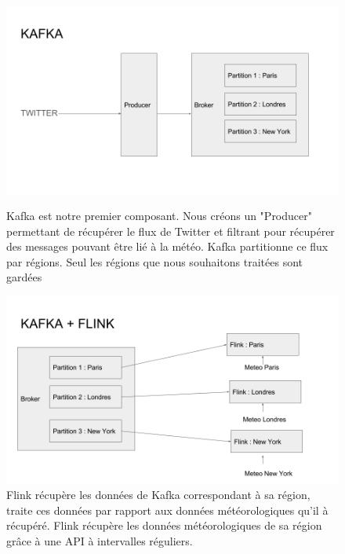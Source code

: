 \documentclass[a4paper,oneside,10pt]{article}
\begin{document}
\begin{figure}[h]
\centering
\includegraphics[width=15cm]{content/Kafka.png}
\caption{Kafka est notre premier composant. Nous créons un "Producer" permettant de récupérer le flux de Twitter et filtrant pour récupérer des messages pouvant être lié à la météo. Kafka partitionne ce flux par régions. Seul les régions que nous souhaitons traitées sont gardées}
\label{fig1}
\centering
\includegraphics[width=15cm]{content/KafkaFlink.png}
\caption{Flink récupère les données de Kafka correspondant à sa région, traite ces données par rapport aux données météorologiques qu'il à récupéré. Flink récupère les données météorologiques de sa région grâce à une API à intervalles réguliers. }
\label{fig1}
\end{figure}

\pagebreak
\end{document}
